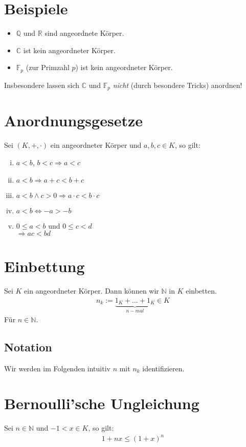 \documentclass{scrreprt}
\newcommand{\NN}{\mathbb{N}}
\newcommand{\QQ}{\mathbb{Q}}
\newcommand{\RR}{\mathbb{R}}
\newcommand{\CC}{\mathbb{C}}
\newcommand{\FF}{\mathbb{F}}
\begin{document}
    \section{Beispiele}
    \begin{itemize}
        \item
            $\QQ$ und $\RR$ sind angeordnete Körper.
        \item
            $\CC$ ist kein angeordneter Körper.
        \item
            $\FF_p$ (zur Primzahl $p$) ist kein angeordneter Körper.
    \end{itemize}
    Insbesondere lassen sich $\CC$ und $\FF_p$ \emph{nicht} (durch besondere Tricks) anordnen!

    \section{Anordnungsgesetze}
    Sei $(K, +, \cdot)$ ein angeordneter Körper und $a,b,c \in K$, so gilt:
    \begin{enumerate}[i)]
        \item
            $a<b$, $b<c \Rightarrow a<c$
        \item
            $a<b \Rightarrow a+c < b+c$
        \item
            $a < b \land c > 0 \Rightarrow a \cdot c < b \cdot c$
        \item
            $a<b \Leftrightarrow -a > -b$
        \item
            $0 \leq a < b$ und $0 \leq c < d$\\
            $\Rightarrow a c < b d$
    \end{enumerate}

    \section{Einbettung}
    Sei $K$ ein angeordneter Körper. Dann können wir $\NN$ in $K$ einbetten.
    \begin{align*}
        n_k := \underbrace{1_K + \dots + 1_K}_{n-mal} \in K
    \end{align*}
    Für $n \in \NN$.

    \subsection{Notation}
    Wir werden im Folgenden intuitiv $n$ mit $n_k$ identifizieren.

    \section{Bernoulli'sche Ungleichung}
    Sei $n \in \NN$ und $-1 < x \in K$, so gilt:
    \begin{align*}
        1+ nx \leq (1 + x)^n
    \end{align*}
\end{document}

